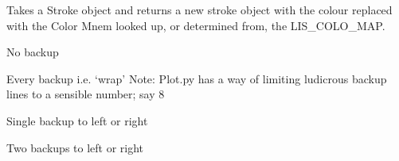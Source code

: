 \documentclass[letterpaper,10pt,english]{sphinxmanual}
\begin{document}

\begin{fulllineitems}
\label{\detokenize{ref/util/plot/PRESCfg:TotalDepth.util.plot.PRESCfg.coloStroke}}
Takes a Stroke object and returns a new stroke object with the colour
replaced with the Color Mnem looked up, or determined from, the LIS\_COLO\_MAP.

\end{fulllineitems}


\begin{fulllineitems}
\label{\detokenize{ref/util/plot/PRESCfg:TotalDepth.util.plot.PRESCfg.BACKUP_NONE}}
No backup

\end{fulllineitems}


\begin{fulllineitems}
\label{\detokenize{ref/util/plot/PRESCfg:TotalDepth.util.plot.PRESCfg.BACKUP_ALL}}
Every backup i.e. ‘wrap’ Note: Plot.py has a way of limiting ludicrous
backup lines to a sensible number; say 8

\end{fulllineitems}


\begin{fulllineitems}
\label{\detokenize{ref/util/plot/PRESCfg:TotalDepth.util.plot.PRESCfg.BACKUP_ONCE}}
Single backup to left or right

\end{fulllineitems}


\begin{fulllineitems}
\label{\detokenize{ref/util/plot/PRESCfg:TotalDepth.util.plot.PRESCfg.BACKUP_TWICE}}
Two backups to left or right

\end{fulllineitems}
\end{document}
